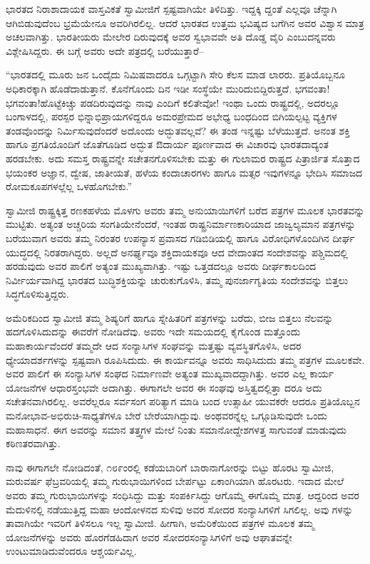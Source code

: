 ಭಾರತದ ನಿರಾಶಾದಾಯಕ ವಾಸ್ತವಿಕತೆ ಸ್ವಾಮೀಜಿಗೆ ಸ್ಪಷ್ಟವಾಗಿಯೇ ತಿಳಿದಿತ್ತು. ಇದ್ದಕ್ಕಿ ದ್ದಂತೆ ಎಲ್ಲವೂ ಚೆನ್ನಾಗಿ ಆಗಿಬಿಡುವುದೆಂಬ ಭ್ರಮೆಯೇನೂ ಅವರಿಗಿರಲಿಲ್ಲ. ಆದರೆ ಭಾರತದ ಉತ್ತಮ ಭವಿಷ್ಯದ ಬಗೆಗಿನ ಅವರ ವಿಶ್ವಾಸ ಮಾತ್ರ ಅಚಲವಾಗಿತ್ತು. ಭಾರತೀಯರು ಮೇಲೇರ ದಿರುವುದಕ್ಕೆ ಅವರ ಸ್ವಭಾವವೇ ಅತಿ ದೊಡ್ಡ ವೈರಿ ಎಂಬುದನ್ನವರು ವಿಶ್ಲೇಷಿಸಿದ್ದರು. ಈ ಬಗ್ಗೆ ಅವರು ಅದೇ ಪತ್ರದಲ್ಲಿ ಬರೆಯುತ್ತಾರೆ–

“ಭಾರತದಲ್ಲಿ ಮೂರು ಜನ ಒಂದೈದು ನಿಮಿಷವಾದರೂ ಒಗ್ಗಟ್ಟಾಗಿ ಸೇರಿ ಕೆಲಸ ಮಾಡ ಲಾರರು. ಪ್ರತಿಯೊಬ್ಬನೂ ಅಧಿಕಾರಕ್ಕಾಗಿ ಹೊಡೆದಾಡುತ್ತಾನೆ. ಕೊನೆಗೊಂದು ದಿನ ಇಡೀ ಸಂಸ್ಥೆಯೇ ಮುರಿದುಬಿದ್ದಿರುತ್ತದೆ. ಭಗವಂತಾ! ಭಗವಂತಾ!ಹೊಟ್ಟೆಕಿಚ್ಚು ಪಡದಿರುವುದನ್ನು ನಾವು ಎಂದಿಗೆ ಕಲಿತೇವೋ! ಇಂಥಾ ಒಂದು ರಾಷ್ಟ್ರದಲ್ಲಿ, ಅದರಲ್ಲೂ ಬಂಗಾಳದಲ್ಲಿ, ಪರಸ್ಪರ ಭಿನ್ನಾಭಿಪ್ರಾಯಗಳಿದ್ದರೂ ಅಮರಪ್ರೇಮದ ಅಭೇಧ್ಯ ಬಂಧದಿಂದ ಬಿಗಿಯಲ್ಪಟ್ಟ ವ್ಯಕ್ತಿಗಳ ತಂಡವೊಂದನ್ನು ನಿರ್ಮಿಸುವುದೆಂದರೆ ಅದೊಂದು ಅದ್ಭುತವಲ್ಲವೆ? ಈ ತಂಡ ಇನ್ನಷ್ಟು ಬೆಳೆಯುತ್ತದೆ. ಅನಂತ ಶಕ್ತಿ ಹಾಗೂ ಪ್ರಗತಿಯೊಂದಿಗೆ ಜೊತೆಗೂಡಿದ ಅದ್ಭುತ ಔದಾರ್ಯ ಪೂರ್ಣವಾದ ಈ ವಿಚಾರವು ಭಾರತದಾದ್ಯಂತ ಹರಡಬೇಕು. ಅದು ಸಮಸ್ತ ರಾಷ್ಟ್ರವನ್ನೇ ಸಚೇತನಗೊಳಿಸಬೇಕು ಮತ್ತು ಈ ಗುಲಾಮರ ರಾಷ್ಟ್ರದ ಪಿತ್ರಾರ್ಜಿತ ಸೊತ್ತಾದ ಭಯಂಕರ ಅಜ್ಞಾನ, ದ್ವೇಷ, ಜಾತೀಯತೆ, ಹಳೆಯ ಕಂದಾಚಾರಗಳು ಹಾಗೂ ಮತ್ಸರ ಇವುಗಳನ್ನೂ ಭೇದಿಸಿ ಸಮಾಜದ ರೋಮಕೂಪಗಳಲ್ಲೆಲ್ಲ ಒಳಹೊಗಬೇಕು.”

ಸ್ವಾಮೀಜಿ ರಾಷ್ಟ್ರಕ್ಕಿತ್ತ ರಣಕಹಳೆಯ ಮೊಳಗು ಅವರು ತಮ್ಮ ಅನುಯಾಯಿಗಳಿಗೆ ಬರೆದ ಪತ್ರಗಳ ಮೂಲಕ ಭಾರತವನ್ನು ಮುಟ್ಟಿತು. ಅತ್ಯಂತ ಅಚ್ಚರಿಯ ಸಂಗತಿಯೇನೆಂದರೆ, ಇಂತಹ ರಾಷ್ಟ್ರನಿರ್ಮಾಣಕಾರಿಯಾದ ಜಾಜ್ವಲ್ಯಮಾನ ಪತ್ರಗಳನ್ನು ಬರೆಯುವಾಗ ಅವರು ತಮ್ಮ ನಿರಂತರ ಉಪನ್ಯಾಸ ಪ್ರವಾಸದ ಗಡಿಬಿಡಿಯಲ್ಲಿ ಹಾಗೂ ವಿರೋಧಿಗಳೊಂದಿಗಿನ ದೀರ್ಘ ಯುದ್ಧದಲ್ಲಿ ನಿರತರಾಗಿದ್ದರು. ಅಲ್ಲದೆ ಅನರ್ಘ್ಯವೂ ಶಕ್ತಿದಾಯಕವೂ ಆದ ವೇದಾಂತದ ಸಂದೇಶವನ್ನು ಪಶ್ಚಿಮದಲ್ಲಿ ಹರಡುವುದು ಅವರ ಪಾಲಿಗೆ ಅತ್ಯಂತ ಮುಖ್ಯವಾಗಿತ್ತು. ಇಷ್ಟು ಒತ್ತಡದಲ್ಲೂ ಅವರು ದೀರ್ಘಕಾಲದಿಂದ ನಿರ್ವೀರ್ಯವಾಗಿದ್ದ ಭಾರತದ ಬುದ್ಧಿಶಕ್ತಿಯನ್ನು ಚುರುಕುಗೊಳಿಸಿ, ತಮ್ಮ ಪುನರ್ಜಾಗೃತಿಯ ಸಂದೇಶವನ್ನು ಬಿತ್ತಲು ಸಿದ್ಧಗೊಳಿಸುತ್ತಿದ್ದರು.

ಅಮೆರಿಕದಿಂದ ಸ್ವಾಮೀಜಿ ತಮ್ಮ ಶಿಷ್ಯರಿಗೆ ಹಾಗೂ ಸ್ನೇಹಿತರಿಗೆ ಪತ್ರಗಳನ್ನು ಬರೆದು, ಬೀಜ ಬಿತ್ತಲು ನೆಲವನ್ನು ಹದಗೊಳಿಸಿದುದನ್ನು ಈವರೆಗೆ ನೋಡಿದೆವು. ಅವರು ಇದೇ ಸಮಯದಲ್ಲಿ ಕೈಗೊಂಡ ಮತ್ತೊಂದು ಮಹಾಕಾರ್ಯವೆಂದರೆ ತಮ್ಮದೇ ಆದ ಸಂನ್ಯಾಸಿಗಳ ಸಂಘವನ್ನು ಮತ್ತಷ್ಟು ವ್ಯವಸ್ಥಿತಗೊಳಿಸಿ, ಅದರ ಧ್ಯೇಯಾದರ್ಶಗಳನ್ನು ಸ್ಪಷ್ಟವಾಗಿ ರೂಪಿಸಿದುದು. ಈ ಕಾರ್ಯವನ್ನೂ ಅವರು ಸಾಧಿಸಿದುದು ತಮ್ಮ ಪತ್ರಗಳ ಮೂಲಕವೇ. ಅವರ ಪಾಲಿಗೆ ಈ ಸಂನ್ಯಾಸಿಗಳ ಸಂಘದ ನಿರ್ಮಾಣವೇ ಅತ್ಯಂತ ಮುಖ್ಯವಾದದ್ದಾಗಿತ್ತು. ಅವರ ಎಲ್ಲ ಕಾರ್ಯ ಯೋಜನೆಗಳ ಆಧಾರಸ್ತಂಭವೇ ಅದಾಗಿತ್ತು. ಈಗಾಗಲೇ ಅವರ ಈ ಸಂಘವು ಅಸ್ತಿತ್ವದಲ್ಲಿತ್ತಾ ದರೂ ಅದು ಸಚೇತನವಾಗಿರಲಿಲ್ಲ. ಅವರೆಲ್ಲರೂ ಸರ್ವಸಂಗ ಪರಿತ್ಯಾಗ ಮಾಡಿ ಬಂದ ಉತ್ಸಾಹೀ ಯುವಕರೇ ಆದರೂ ಪ್ರತಿಯೊಬ್ಬನ ಮನೋಭಾವ-ಅಭಿರುಚಿ-ಸಾಧ್ಯತೆಗಳೂ ಬೇರೆ ಬೇರೆಯಾಗಿದ್ದುವು. ಅಂಥವರನ್ನೆಲ್ಲ ಒಗ್ಗೂಡಿಸುವುದೇ ಒಂದು ಮಹಾಸಾಧನೆ. ಈಗ ಅವರನ್ನು ಸಮಾನ ತತ್ತ್ವಗಳ ಮೇಲೆ ನಿಂತು ಸಮಾನೋದ್ದೇಶಗಳತ್ತ ಸಾಗುವಂತೆ ಮಾಡುವುದು ಕಠಿಣತರವಾಗಿತ್ತು.

ನಾವು ಈಗಾಗಲೇ ನೋಡಿದಂತೆ, ೧೮೯ಂರಲ್ಲಿ ಕಡೆಯಬಾರಿಗೆ ಬಾರಾನಾಗೋರನ್ನು ಬಿಟ್ಟು ಹೊರಟ ಸ್ವಾಮೀಜಿ, ಮರುವರ್ಷ ಫೆಬ್ರವರಿಯಲ್ಲಿ ತಮ್ಮ ಗುರುಭಾಯಿಗಳಿಂದ ಬೇರ್ಪಟ್ಟು ಏಕಾಂಗಿಯಾಗಿ ಹೊರಟರು. ಇದಾದ ಮೇಲೆ ಅವರು ತಮ್ಮ ಗುರುಭಾಯಿಗಳನ್ನು ಸಂಧಿಸಿದ್ದು ಮತ್ತು ಸಂಪರ್ಕಿಸಿದ್ದು ಆಗೊಮ್ಮೆ ಈಗೊಮ್ಮೆ ಮಾತ್ರ. ಆದ್ದರಿಂದ ಅವರ ಮೆದುಳಿನಲ್ಲಿ ನಡೆಯುತ್ತಿದ್ದ ಮಹಾ ಆಂದೋಳನದ ಸುಳಿವು ಅವರ ಸೋದರ ಸಂನ್ಯಾಸಿಗಳಿಗೆ ಸಿಗಲಿಲ್ಲ. ಅವು ಗಳನ್ನು ತಾವಾಗಿಯೇ ಇವರಿಗೆ ತಿಳಿಸಲೂ ಇಲ್ಲ ಸ್ವಾಮೀಜಿ. ಹೀಗಾಗಿ, ಅಮೆರಿಕೆಯಿಂದ ಪತ್ರಗಳ ಮೂಲಕ ತಮ್ಮ ಯೋಜನೆಗಳನ್ನು ಅವರು ಹೊರಗೆಡಹಿದಾಗ ಅವರ ಸೋದರಸಂನ್ಯಾಸಿಗಳಿಗೆ ಅವು ಆಘಾತವನ್ನೇ ಉಂಟುಮಾಡಿದುವೆಂದರೂ ಆಶ್ಚರ್ಯವಿಲ್ಲ.

